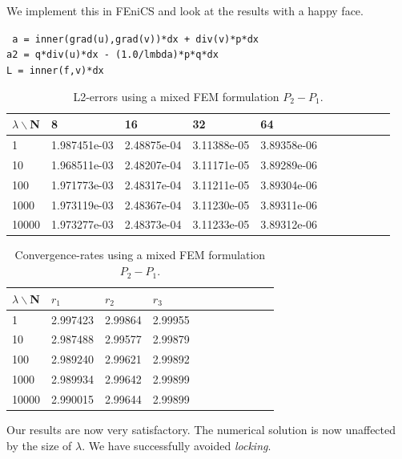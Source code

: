 \documentclass[11pt,a4paper,english]{article}
\numberwithin{equation}{section}
\begin{document}
We implement this in FEniCS and look at the results with a happy face. 

\begin{framed}
\texttt{	a = inner(grad(u),grad(v))*dx + div(v)*p*dx \\
	a2 = q*div(u)*dx - (1.0/lmbda)*p*q*dx \\
	 L = inner(f,v)*dx  }
\end{framed}

\begin{table}[H]
\centering
\caption{ L2-errors using a mixed FEM formulation $P_2 -P_1$. }
\vspace{3mm}
\begin{tabular}{|l|l|l|l|l|l|l|l|l|l|l|}
\hline
$\lambda \backslash$N & 8 & 16 & 32 & 64 \\
\hline
1 & 1.987451e-03 & 2.48875e-04 & 3.11388e-05 & 3.89358e-06 \\
\hline
10 & 1.968511e-03 & 2.48207e-04 & 3.11171e-05 & 3.89289e-06 \\
\hline
100 & 1.971773e-03 & 2.48317e-04 & 3.11211e-05 & 3.89304e-06 \\
\hline
1000 & 1.973119e-03 & 2.48367e-04 & 3.11230e-05 & 3.89311e-06 \\
\hline
10000 & 1.973277e-03 & 2.48373e-04 & 3.11233e-05 & 3.89312e-06 \\
\hline
\end{tabular}
\end{table}

\begin{table}[H]
\centering
\caption{ Convergence-rates using a mixed FEM formulation $P_2 -P_1$.}
\vspace{3mm}
\begin{tabular}{|l|l|l|l|l|l|l|l|l|l|l|}
\hline
$\lambda \backslash$N & $r_1$ & $r_2$ & $r_3$ \\
\hline
1 & 2.997423 & 2.99864 & 2.99955 \\
\hline
10 & 2.987488 & 2.99577 & 2.99879 \\
\hline
100 & 2.989240 & 2.99621 & 2.99892 \\
\hline
1000 & 2.989934 & 2.99642 & 2.99899 \\
\hline
10000 & 2.990015 & 2.99644 & 2.99899 \\
\hline
\end{tabular}
\end{table}

Our results are now very satisfactory. The numerical solution is now unaffected by the size of $\lambda$. We have successfully avoided \emph{locking}.  
\end{document}
